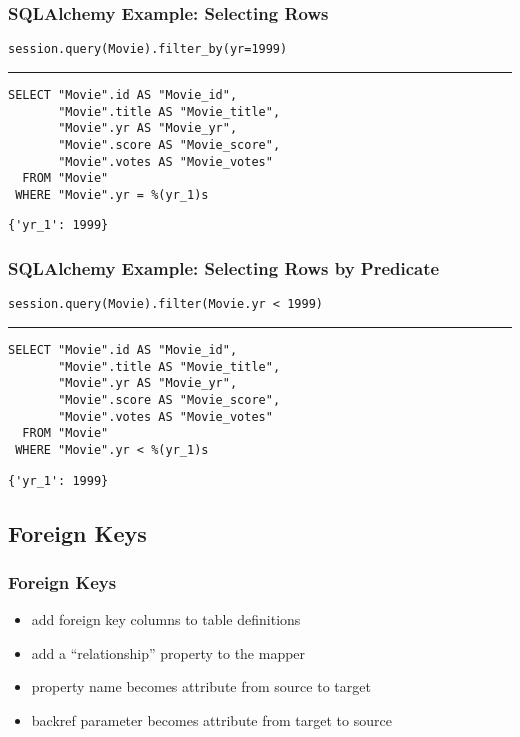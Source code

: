 \documentclass[dvipsnames]{beamer}
\theoremstyle{plain}
\begin{document}
\begin{frame}[fragile]
  \frametitle{SQLAlchemy Example: Selecting Rows}

  \begin{lstlisting}
session.query(Movie).filter_by(yr=1999)
  \end{lstlisting}
  \hrule

  \begin{lstlisting}[language=FullSQL]
SELECT "Movie".id AS "Movie_id",
       "Movie".title AS "Movie_title",
       "Movie".yr AS "Movie_yr",
       "Movie".score AS "Movie_score",
       "Movie".votes AS "Movie_votes"
  FROM "Movie"
 WHERE "Movie".yr = %(yr_1)s
  \end{lstlisting}

  \begin{lstlisting}
{'yr_1': 1999}
  \end{lstlisting}
\end{frame}

\begin{frame}[fragile]
  \frametitle{SQLAlchemy Example: Selecting Rows by Predicate}

  \begin{lstlisting}
session.query(Movie).filter(Movie.yr < 1999)
  \end{lstlisting}
  \hrule

  \begin{lstlisting}[language=FullSQL]
SELECT "Movie".id AS "Movie_id",
       "Movie".title AS "Movie_title",
       "Movie".yr AS "Movie_yr",
       "Movie".score AS "Movie_score",
       "Movie".votes AS "Movie_votes"
  FROM "Movie"
 WHERE "Movie".yr < %(yr_1)s
  \end{lstlisting}

  \begin{lstlisting}
{'yr_1': 1999}
  \end{lstlisting}
\end{frame}

\subsection{Foreign Keys}

\begin{frame}
  \frametitle{Foreign Keys}

  \begin{itemize}
    \item add foreign key columns to table definitions
    \item add a ``relationship'' property to the mapper
    \item property name becomes attribute from source to target
    \item backref parameter becomes attribute from target to source
  \end{itemize}
\end{frame}
\end{document}
